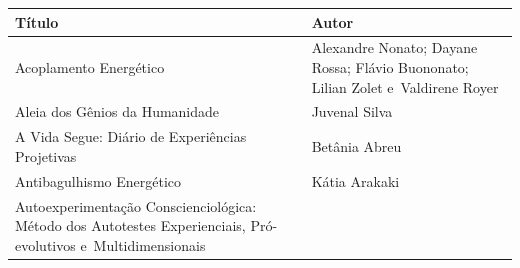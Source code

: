 \documentclass{gescons}
\begin{document}
\begin{longtable}[]{@{}
  >{\raggedright\arraybackslash}p{}
  >{\raggedright\arraybackslash}p{}@{}}
\toprule\noalign{}
\begin{minipage}[t]{\linewidth}\centering
\textbf{Título}
\end{minipage} & \begin{minipage}[t]{\linewidth}\centering
\textbf{Autor}
\end{minipage} \\
\hline
\begin{minipage}[t]{\linewidth}\raggedright
Acoplamento Energético
\end{minipage} & \begin{minipage}[t]{\linewidth}\raggedright
Alexandre Nonato; Dayane Rossa; Flávio Buononato; Lilian Zolet e~Valdirene Royer
\end{minipage} \\
\hline
\begin{minipage}[t]{\linewidth}\raggedright
Aleia dos Gênios da Humanidade
\end{minipage} & \begin{minipage}[t]{\linewidth}\raggedright
Juvenal Silva
\end{minipage} \\
\hline
\begin{minipage}[t]{\linewidth}\raggedright
A Vida Segue: Diário de Experiências Projetivas
\end{minipage} & \begin{minipage}[t]{\linewidth}\raggedright
Betânia Abreu
\end{minipage} \\
\hline
\begin{minipage}[t]{\linewidth}\raggedright
Antibagulhismo Energético
\end{minipage} & \begin{minipage}[t]{\linewidth}\raggedright
Kátia Arakaki
\end{minipage} \\
\hline
\begin{minipage}[t]{\linewidth}\raggedright
Autoexperimentação Conscienciológica: Método dos Autotestes Experienciais, Pró-evolutivos e~Multidimensionais
\end{minipage} & \begin{minipage}[t]{\linewidth}\raggedright

\end{minipage}
\end{longtable}
\end{document}
